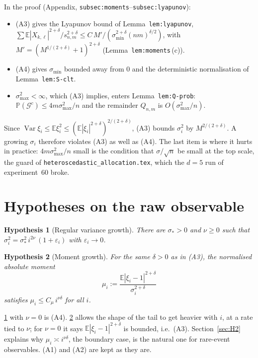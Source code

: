 \documentclass[11pt]{article}
\newtheorem{hypothesis}{Hypothesis}
\newcommand{\E}{\mathbb{E}}
\newcommand{\Prob}{\mathbb{P}}
\newcommand{\Var}{\operatorname{Var}}
\newcommand{\lbl}[1]{\texttt{#1}}
\begin{document}
\noindent In the proof (Appendix, \lbl{subsec:moments}--\lbl{subsec:lyapunov}):
\begin{itemize}
  \item (A3) gives the Lyapunov bound of Lemma~\lbl{lem:lyapunov},
  $\sum\E|X_{k,\ell}|^{2+\delta}/s_{n,m}^{2+\delta}\le
  C\,M'/(\sigma_{\min}^{2+\delta}(nm)^{\delta/2})$, with
  $M'=(M^{1/(2+\delta)}+1)^{2+\delta}$ (Lemma~\lbl{lem:moments}\,(c)).
  \item (A4) gives $\sigma_{\min}$ bounded away from $0$ and the
  deterministic normalisation of Lemma~\lbl{lem:S-clt}.
  \item $\sigma_{\max}^2<\infty$, which (A3) implies, enters
  Lemma~\lbl{lem:Q-prob}: $\Prob(\mathcal G^c)\le4m\sigma_{\max}^2/n$ and the
  remainder $Q_{n,m}$ is $O(\sigma_{\max}^2/n)$.
\end{itemize}

\noindent Since $\Var\xi_i\le\E\xi_i^2\le(\E|\xi_i|^{2+\delta})^{2/(2+\delta)}$,
(A3) bounds $\sigma_i^2$ by $M^{2/(2+\delta)}$. A growing $\sigma_i$ therefore
violates (A3) as well as (A4). The last item is where it hurts in practice:
$4m\sigma_{\max}^2/n$ small is the condition that $\sigma/\sqrt n$ be small
at the top scale, the guard of \texttt{heteroscedastic\_allocation.tex}, which
the $d=5$ run of experiment~60 broke.

\section{Hypotheses on the raw observable}

\begin{hypothesis}[Regular variance growth]\label{H:var}
There are $\sigma_*>0$ and $\nu\ge0$ such that
$\sigma_i^2=\sigma_*^2\,i^{2\nu}\,(1+\varepsilon_i)$ with $\varepsilon_i\to0$.
\end{hypothesis}

\begin{hypothesis}[Moment growth]\label{H:mom}
For the same $\delta>0$ as in (A3), the normalised absolute moment
\[
  \mu_i:=\frac{\E|\xi_i-1|^{2+\delta}}{\sigma_i^{2+\delta}}
\]
satisfies $\mu_i\le C_\mu\,i^{\nu\delta}$ for all $i$.
\end{hypothesis}

\noindent \ref{H:var} with $\nu=0$ is (A4). \ref{H:mom} allows the shape of the
tail to get heavier with $i$, at a rate tied to $\nu$; for $\nu=0$ it says
$\E|\xi_i-1|^{2+\delta}$ is bounded, i.e.\ (A3). Section~\ref{sec:H2} explains
why $\mu_i\asymp i^{\nu\delta}$, the boundary case, is the natural one for
rare-event observables. (A1) and (A2) are kept as they are.
\end{document}
